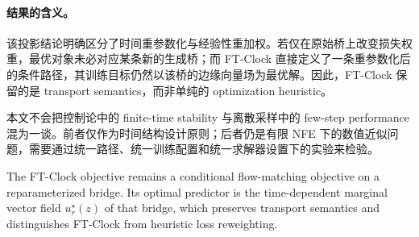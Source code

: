 \paragraph{结果的含义。}
该投影结论明确区分了时间重参数化与经验性重加权。若仅在原始桥上改变损失权重，最优对象未必对应某条新的生成桥；而 FT-Clock 直接定义了一条重参数化后的条件路径，其训练目标仍然以该桥的边缘向量场为最优解。因此，FT-Clock 保留的是 transport semantics，而非单纯的 optimization heuristic。

\begin{remark}
本文不会把控制论中的 finite-time stability 与离散采样中的 few-step performance 混为一谈。前者仅作为时间结构设计原则；后者仍是有限 NFE 下的数值近似问题，需要通过统一路径、统一训练配置和统一求解器设置下的实验来检验。
\end{remark}
\else
The FT-Clock objective remains a conditional flow-matching objective on a reparameterized bridge. Its optimal predictor is the time-dependent marginal vector field $u_r^\star(z)$ of that bridge, which preserves transport semantics and distinguishes FT-Clock from heuristic loss reweighting.
\fi
